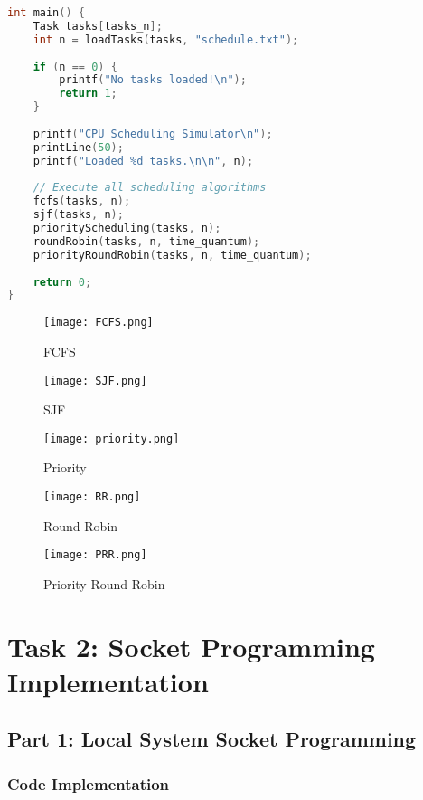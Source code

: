 \documentclass{article}
\begin{document}
\begin{lstlisting}[language=C, caption=Scheduling Code ]
int main() {
    Task tasks[tasks_n];
    int n = loadTasks(tasks, "schedule.txt");
    
    if (n == 0) {
        printf("No tasks loaded!\n");
        return 1;
    }
    
    printf("CPU Scheduling Simulator\n");
    printLine(50);
    printf("Loaded %d tasks.\n\n", n);
    
    // Execute all scheduling algorithms
    fcfs(tasks, n);
    sjf(tasks, n);
    priorityScheduling(tasks, n);
    roundRobin(tasks, n, time_quantum);
    priorityRoundRobin(tasks, n, time_quantum);
    
    return 0;
}
\end{lstlisting}

\begin{figure}[H]
    \centering
    \texttt{[image: FCFS.png]}
    \caption{FCFS}
    \label{fig:fcfs}
\end{figure}

\begin{figure}[H]
    \centering
    \texttt{[image: SJF.png]}
    \caption{SJF}
    \label{fig:sjf}
\end{figure}

\begin{figure}[H]
    \centering
    \texttt{[image: priority.png]}
    \caption{Priority}
    \label{fig:priority}
\end{figure}

\begin{figure}[H]
    \centering
    \texttt{[image: RR.png]}
    \caption{Round Robin}
    \label{fig:RR}
\end{figure}

\begin{figure}[H]
    \centering
    \texttt{[image: PRR.png]}
    \caption{Priority Round Robin}
    \label{fig:PRR}
\end{figure}

\section*{Task 2: Socket Programming Implementation}

\subsection*{Part 1: Local System Socket Programming}

\subsubsection*{Code Implementation}
\end{document}
